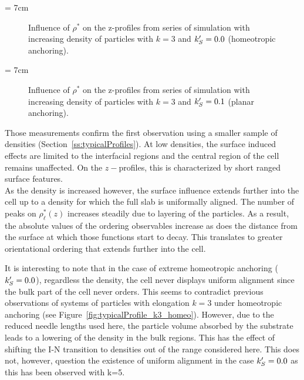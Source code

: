 \picW = 7cm
\begin{figure}
        \centering
	\caption{Influence of $\rho^{*}$ on the z-profiles from series of simulation with
	increasing density of particles with $k=3$ and $k_S^{\prime} = 0.0$ (homeotropic anchoring).}
	\label{fig:rhoInfl_k3_L000}
\end{figure}
\picW = 7cm
\begin{figure}
        \centering
	\caption{Influence of $\rho^{*}$ on the z-profiles from series of simulation with
	increasing density of particles with $k=3$ and $k_S^{\prime} = 0.1$ (planar anchoring).}
	\label{fig:rhoInfl_k3_L100}
\end{figure}

Those measurements confirm the first observation using a smaller sample of densities 
(Section~\ref{ss:typicalProfiles}). At low densities, the surface induced effects are 
limited to the interfacial regions and the central region of the cell remains unaffected. 
On the $z-$profiles, this is characterized by short ranged surface features.\\
As the density is increased however, the surface influence extends further into the cell up to a
density for which the full slab is uniformally aligned.  The number of peaks on $\rho^{*}_\ell(z)$ 
increases steadily due to layering of the particles. As a result, the absolute values of the ordering 
observables increase as does the distance from the surface at which those functions 
start to decay. This translates to greater orientational ordering that extends further into the cell.

It is interesting to note that in the case of extreme homeotropic anchoring ($k_S^{\prime} = 0.0$),
regardless the density, the cell never displays uniform alignment since the bulk part of the
cell never orders. This seems to contradict previous observations of systems of particles with
elongation $k=3$ under homeotropic anchoring
(see Figure~\ref{fig:typicalProfile_k3_homeo}). However, due to the reduced needle lengths used
here, the particle volume absorbed by the substrate leads to a lowering of the density in the
bulk regions. This has the effect of shifting the I-N transition to densities out of the range
considered here. This does not, however, question the existence of uniform alignment in the case
$k_S^{\prime} = 0.0$ as this has been observed with k=5.\\

